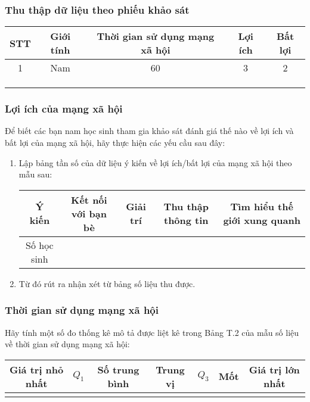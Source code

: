 \subsubsection{Thu thập dữ liệu theo phiếu khảo sát}
\begin{center}
	\begin{tabular}{|c|c|c|c|c|}
	\hline
	STT & Giới tính & Thời gian sử dụng mạng xã hội & Lợi ích & Bất lợi\\
	\hline
	1& Nam &60 &3 &2 \\
	\hline
	&  &  &  & \\
	\hline
	&  &  &  & \\
	\hline
	&  &  &  & \\
	\hline
\end{tabular}
\end{center}
\subsubsection{Lợi ích của mạng xã hội}
Để biết các bạn nam học sinh tham gia khảo sát đánh giá thế nào về lợi ích và bất lợi của mạng xã hội, hãy thực hiện các yếu cầu sau đây:
\begin{enumerate}
	\item Lập bảng tần số của dữ liệu ý kiến về lợi ích/bất lợi của mạng xã hội theo mẫu sau:
\begin{center}
		\begin{tabular}{|c|c|c|c|c|}
		\hline
		Ý kiến & Kết nối với bạn bè & Giải trí &Thu thập thông tin & Tìm hiểu thế giới xung quanh\\
		\hline
		Số học sinh & & & &\\
		\hline
	\end{tabular}
\end{center}
	\item Từ đó rút ra nhận xét từ bảng số liệu thu được.
\end{enumerate}

\subsubsection{Thời gian sử dụng mạng xã hội}
Hãy tính một số đo thống kê mô tả được liệt kê trong Bảng T.2 của mẫu số liệu về thời gian sử dụng mạng xã hội:
\begin{center}
		\begin{tabular}{|c|c|c|c|c|c|c|}
		\hline
		Giá trị nhỏ nhất & $Q_1$ &Số trung bình & Trung vị &$Q_3$ & Mốt & Giá trị lớn nhất \\
		\hline
		& & & & & &\\
		\hline
	\end{tabular}
\end{center}

